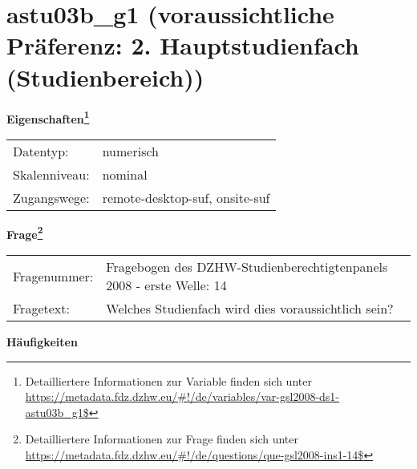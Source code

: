 
    \setcounter{footnote}{0}

    \vspace*{-1.8cm}
	\section{astu03b\_g1 (voraussichtliche Präferenz: 2. Hauptstudienfach (Studienbereich))}
	\label{section:astu03b_g1}



    \vspace*{0.5cm}
    \noindent\textbf{Eigenschaften\footnote{Detailliertere Informationen zur Variable finden sich unter
		\url{https://metadata.fdz.dzhw.eu/\#!/de/variables/var-gsl2008-ds1-astu03b_g1$}}}\\
	\begin{tabularx}{\hsize}{@{}lX}
	Datentyp: & numerisch \\
	Skalenniveau: & nominal \\
	Zugangswege: &
	  remote-desktop-suf, 
	  onsite-suf
 \\
    \end{tabularx}



				\vspace*{0.5cm}
                \noindent\textbf{Frage\footnote{Detailliertere Informationen zur Frage finden sich unter
		              \url{https://metadata.fdz.dzhw.eu/\#!/de/questions/que-gsl2008-ins1-14$}}}\\
				\begin{tabularx}{\hsize}{@{}lX}
					Fragenummer: &
					  Fragebogen des DZHW-Studienberechtigtenpanels 2008 - erste Welle:
					  14
 \\
					Fragetext: & Welches Studienfach wird dies voraussichtlich sein? \\
				\end{tabularx}





        		\vspace*{0.5cm}
                \noindent\textbf{Häufigkeiten}

